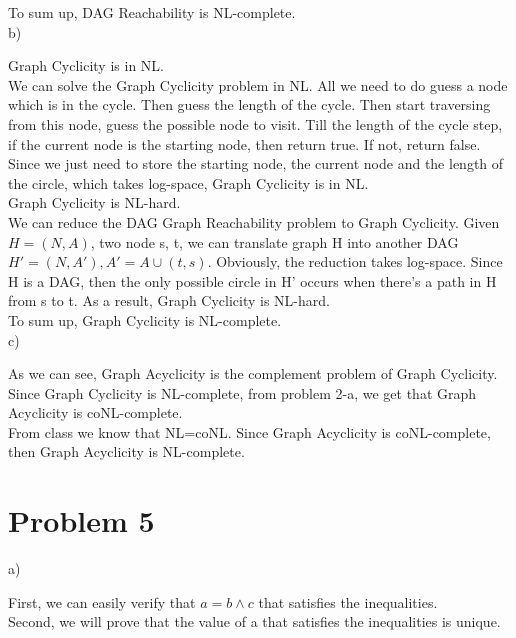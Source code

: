 \documentclass[12pt]{article}
\begin{document}
To sum up, DAG Reachability is NL-complete. \\

b)

Graph Cyclicity is in NL. \\

We can solve the Graph Cyclicity problem in NL. All we need to do
guess a node which is in the cycle. Then guess the length of the
cycle. Then start traversing from this node, guess the possible node
to visit. Till the length of the cycle step, if the current node is
the starting node, then return true. If not, return false. Since we
just need to store the starting node, the current node and the length
of the circle, which takes log-space, Graph Cyclicity is in NL. \\

Graph Cyclicity is NL-hard. \\

We can reduce the DAG Graph Reachability problem to Graph
Cyclicity. Given $H = (N,A)$, two node s, t, we can translate graph H
into another DAG $H' = (N, A'), A' = A \cup {(t,s)}$. Obviously, the
reduction takes log-space. Since H is a DAG, then the only possible
circle in H' occurs when there's a path in H from s to t. As a result,
Graph Cyclicity is NL-hard. \\

To sum up, Graph Cyclicity is NL-complete. \\

c)

As we can see, Graph Acyclicity is the complement problem of Graph
Cyclicity. Since Graph Cyclicity is NL-complete, from problem 2-a, we
get that Graph Acyclicity is coNL-complete. \\

From class we know that NL=coNL. Since Graph Acyclicity is
coNL-complete, then Graph Acyclicity is NL-complete. \\

\section*{Problem 5}

a)

First, we can easily verify that $a = b \land c$ that satisfies the
inequalities. \\

Second, we will prove that the value of a that satisfies the
inequalities is unique. \\
\end{document}
